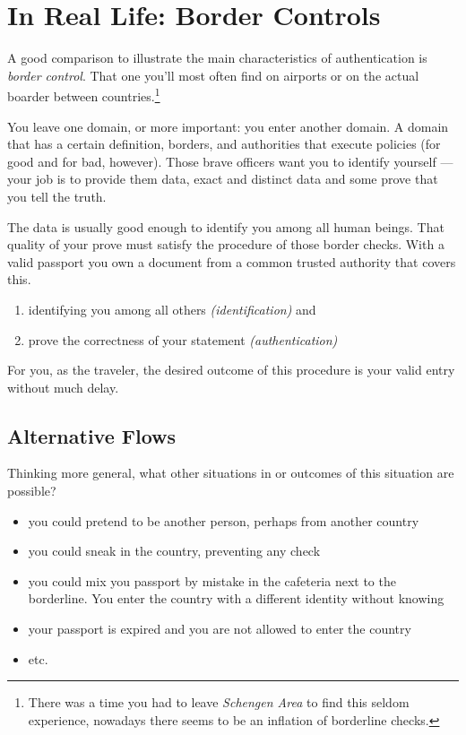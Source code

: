 \section{In Real Life: Border Controls}

A good comparison to illustrate the main characteristics of
authentication is \emph{border control}. That one you'll most often find
on airports or on the actual boarder between countries.\footnote{There
    was a time you had to leave \emph{Schengen Area} to find this seldom
experience, nowadays there seems to be an inflation of borderline
checks.}

You leave one domain, or more important: you enter another domain. 
A domain that has a certain definition, borders, and authorities that 
execute policies (for good and for bad, however).  Those brave officers 
want you to identify yourself --- your job is to provide them data, exact 
and distinct data and some prove that you tell the truth.

The data is usually good enough to identify you among all human beings.
That quality of your prove must satisfy the procedure of those border
checks. With a valid passport you own a document from a common trusted
authority that covers this.

\begin{enumerate}
    \item identifying you among all others \emph{(identification)} and
    \item prove the correctness of your statement
        \emph{(authentication)}
\end{enumerate}

For you, as the traveler, the desired outcome of this procedure is your
valid entry without much delay.


\subsection{Alternative Flows}

Thinking more general, what other situations in or outcomes of this
situation are possible?

\begin{itemize}
    \item you could pretend to be another person, perhaps from another 
        country
    \item you could sneak in the country, preventing any check
    \item you could mix you passport by mistake in the cafeteria next 
        to the borderline.  You enter the country with a different identity 
        without knowing
    \item your passport is expired and you are not allowed to enter the 
        country
    \item etc.
\end{itemize}

